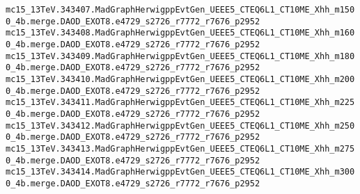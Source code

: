 {\verb|mc15_13TeV.343407.MadGraphHerwigppEvtGen_UEEE5_CTEQ6L1_CT10ME_Xhh_m1500_4b.merge.DAOD_EXOT8.e4729_s2726_r7772_r7676_p2952|\\
\verb|mc15_13TeV.343408.MadGraphHerwigppEvtGen_UEEE5_CTEQ6L1_CT10ME_Xhh_m1600_4b.merge.DAOD_EXOT8.e4729_s2726_r7772_r7676_p2952|\\
\verb|mc15_13TeV.343409.MadGraphHerwigppEvtGen_UEEE5_CTEQ6L1_CT10ME_Xhh_m1800_4b.merge.DAOD_EXOT8.e4729_s2726_r7772_r7676_p2952|\\
\verb|mc15_13TeV.343410.MadGraphHerwigppEvtGen_UEEE5_CTEQ6L1_CT10ME_Xhh_m2000_4b.merge.DAOD_EXOT8.e4729_s2726_r7772_r7676_p2952|\\
\verb|mc15_13TeV.343411.MadGraphHerwigppEvtGen_UEEE5_CTEQ6L1_CT10ME_Xhh_m2250_4b.merge.DAOD_EXOT8.e4729_s2726_r7772_r7676_p2952|\\
\verb|mc15_13TeV.343412.MadGraphHerwigppEvtGen_UEEE5_CTEQ6L1_CT10ME_Xhh_m2500_4b.merge.DAOD_EXOT8.e4729_s2726_r7772_r7676_p2952|\\
\verb|mc15_13TeV.343413.MadGraphHerwigppEvtGen_UEEE5_CTEQ6L1_CT10ME_Xhh_m2750_4b.merge.DAOD_EXOT8.e4729_s2726_r7772_r7676_p2952|\\
\verb|mc15_13TeV.343414.MadGraphHerwigppEvtGen_UEEE5_CTEQ6L1_CT10ME_Xhh_m3000_4b.merge.DAOD_EXOT8.e4729_s2726_r7772_r7676_p2952|
}
\noindent
